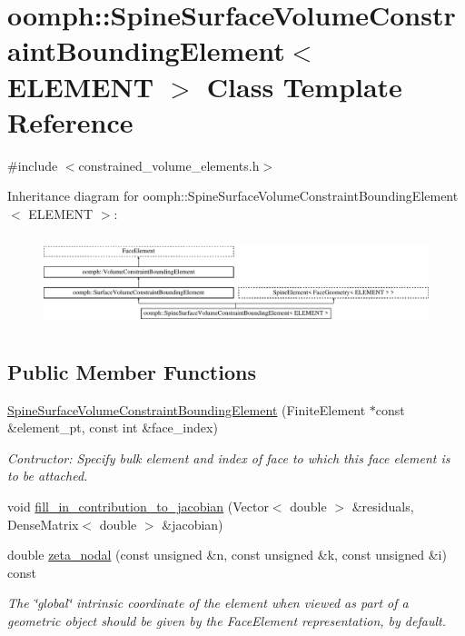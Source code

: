 \hypertarget{classoomph_1_1SpineSurfaceVolumeConstraintBoundingElement}{}\section{oomph\+:\+:Spine\+Surface\+Volume\+Constraint\+Bounding\+Element$<$ E\+L\+E\+M\+E\+NT $>$ Class Template Reference}
\label{classoomph_1_1SpineSurfaceVolumeConstraintBoundingElement}


{\ttfamily \#include $<$constrained\+\_\+volume\+\_\+elements.\+h$>$}

Inheritance diagram for oomph\+:\+:Spine\+Surface\+Volume\+Constraint\+Bounding\+Element$<$ E\+L\+E\+M\+E\+NT $>$\+:\begin{figure}[H]
\begin{center}
\leavevmode
\includegraphics[height=2.679426cm]{classoomph_1_1SpineSurfaceVolumeConstraintBoundingElement}
\end{center}
\end{figure}
\subsection*{Public Member Functions}
\begin{DoxyCompactItemize}
\item 
\hyperlink{classoomph_1_1SpineSurfaceVolumeConstraintBoundingElement_a1426f4750d43008e7c33526cf01f23f3}{Spine\+Surface\+Volume\+Constraint\+Bounding\+Element} (Finite\+Element $\ast$const \&element\+\_\+pt, const int \&face\+\_\+index)
\begin{DoxyCompactList}\small\item\em Contructor\+: Specify bulk element and index of face to which this face element is to be attached. \end{DoxyCompactList}\item 
void \hyperlink{classoomph_1_1SpineSurfaceVolumeConstraintBoundingElement_a5eec2e025f24120c6f2a959da70bb5b1}{fill\+\_\+in\+\_\+contribution\+\_\+to\+\_\+jacobian} (Vector$<$ double $>$ \&residuals, Dense\+Matrix$<$ double $>$ \&jacobian)
\item 
double \hyperlink{classoomph_1_1SpineSurfaceVolumeConstraintBoundingElement_aa252629ad8c455a83b5f2e9643a36e94}{zeta\+\_\+nodal} (const unsigned \&n, const unsigned \&k, const unsigned \&i) const
\begin{DoxyCompactList}\small\item\em The \char`\"{}global\char`\"{} intrinsic coordinate of the element when viewed as part of a geometric object should be given by the Face\+Element representation, by default. \end{DoxyCompactList}\end{DoxyCompactItemize}
